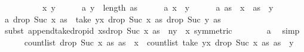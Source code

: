 \begin{isabellebody}
\ \ \isamarkupfalse%
\ {\isacharminus}{\kern0pt}\isanewline
\ \ \ \ \isamarkupfalse%
\ x\ y\isanewline
\ \ \ \ \isamarkupfalse%
\ a{}{\isacharunderscore}{\kern0pt}{}{\isacharcolon}{\kern0pt}\ {\isachardoublequoteopen}y\ {\isacharless}{\kern0pt}\ length\ as{\isachardoublequoteclose}\isanewline
\ \ \ \ \isamarkupfalse%
\ a{}{\isacharunderscore}{\kern0pt}{}{\isacharcolon}{\kern0pt}\ {\isachardoublequoteopen}x\ {\isacharless}{\kern0pt}\ y{\isachardoublequoteclose}\isanewline
\ \ \ \ \isamarkupfalse%
\ a{}{\isacharunderscore}{\kern0pt}{}{\isacharcolon}{\kern0pt}\ {\isachardoublequoteopen}as\ {\isacharbang}{\kern0pt}\ x\ {\isacharequal}{\kern0pt}\ as\ {\isacharbang}{\kern0pt}\ y{\isachardoublequoteclose}\isanewline
\ \ \ \ \isamarkupfalse%
\ a{}{\isacharunderscore}{\kern0pt}{}{\isacharcolon}{\kern0pt}\ {\isachardoublequoteopen}drop\ {\isacharparenleft}{\kern0pt}Suc\ x{\isacharparenright}{\kern0pt}\ as\ {\isacharequal}{\kern0pt}\ take\ {\isacharparenleft}{\kern0pt}y{\isacharminus}{\kern0pt}x{\isacharparenright}{\kern0pt}\ {\isacharparenleft}{\kern0pt}drop\ {\isacharparenleft}{\kern0pt}Suc\ x{\isacharparenright}{\kern0pt}\ as{\isacharparenright}{\kern0pt}{\isacharat}{\kern0pt}\ drop\ {\isacharparenleft}{\kern0pt}Suc\ y{\isacharparenright}{\kern0pt}\ as{\isachardoublequoteclose}\isanewline
\ \ \ \ \ \ \isamarkupfalse%
\ {\isacharparenleft}{\kern0pt}subst\ append{\isacharunderscore}{\kern0pt}take{\isacharunderscore}{\kern0pt}drop{\isacharunderscore}{\kern0pt}id{\isacharbrackleft}{\kern0pt}\ xs{\isacharequal}{\kern0pt}{\isachardoublequoteopen}drop\ {\isacharparenleft}{\kern0pt}Suc\ x{\isacharparenright}{\kern0pt}\ as{\isachardoublequoteclose}\ \ n{\isacharequal}{\kern0pt}{\isachardoublequoteopen}y\ {\isacharminus}{\kern0pt}\ x{\isachardoublequoteclose}{\isacharcomma}{\kern0pt}\ symmetric{\isacharbrackright}{\kern0pt}{\isacharparenright}{\kern0pt}\isanewline
\ \ \ \ \ \ \isamarkupfalse%
\ a{}{\isacharunderscore}{\kern0pt}{}\ \isamarkupfalse%
\ simp\isanewline
\ \ \ \ \isamarkupfalse%
\ {\isachardoublequoteopen}count{\isacharunderscore}{\kern0pt}list\ {\isacharparenleft}{\kern0pt}drop\ {\isacharparenleft}{\kern0pt}Suc\ x{\isacharparenright}{\kern0pt}\ as{\isacharparenright}{\kern0pt}\ {\isacharparenleft}{\kern0pt}as\ {\isacharbang}{\kern0pt}\ x{\isacharparenright}{\kern0pt}\ {\isacharequal}{\kern0pt}\ count{\isacharunderscore}{\kern0pt}list\ {\isacharparenleft}{\kern0pt}take\ {\isacharparenleft}{\kern0pt}y{\isacharminus}{\kern0pt}x{\isacharparenright}{\kern0pt}\ {\isacharparenleft}{\kern0pt}drop\ {\isacharparenleft}{\kern0pt}Suc\ x{\isacharparenright}{\kern0pt}\ as{\isacharparenright}{\kern0pt}{\isacharparenright}{\kern0pt}\ {\isacharparenleft}{\kern0pt}as\ {\isacharbang}{\kern0pt}\ y{\isacharparenright}{\kern0pt}\ {\isacharplus}{\kern0pt}\isanewline

\end{isabellebody}
